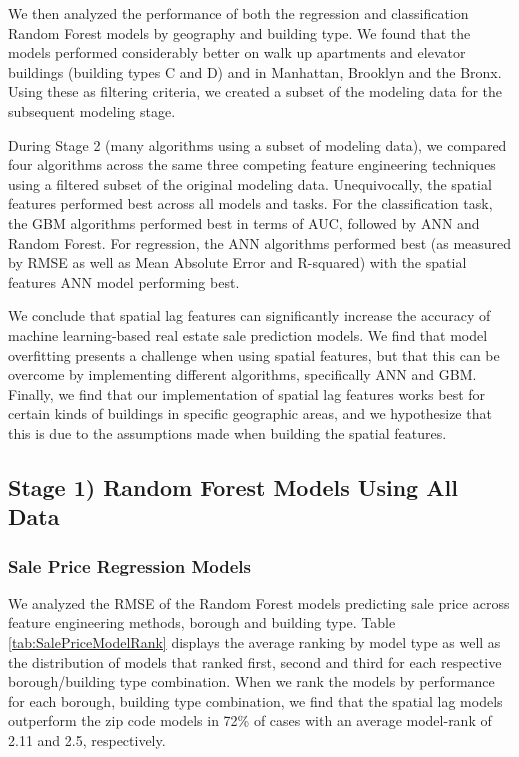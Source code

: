 \documentclass[12pt,]{article}
\begin{document}
We then analyzed the performance of both the regression and
classification Random Forest models by geography and building type. We
found that the models performed considerably better on walk up
apartments and elevator buildings (building types C and D) and in
Manhattan, Brooklyn and the Bronx. Using these as filtering criteria, we
created a subset of the modeling data for the subsequent modeling stage.

During Stage 2 (many algorithms using a subset of modeling data), we
compared four algorithms across the same three competing feature
engineering techniques using a filtered subset of the original modeling
data. Unequivocally, the spatial features performed best across all
models and tasks. For the classification task, the GBM algorithms
performed best in terms of AUC, followed by ANN and Random Forest. For
regression, the ANN algorithms performed best (as measured by RMSE as
well as Mean Absolute Error and R-squared) with the spatial features ANN
model performing best.

We conclude that spatial lag features can significantly increase the
accuracy of machine learning-based real estate sale prediction models.
We find that model overfitting presents a challenge when using spatial
features, but that this can be overcome by implementing different
algorithms, specifically ANN and GBM. Finally, we find that our
implementation of spatial lag features works best for certain kinds of
buildings in specific geographic areas, and we hypothesize that this is
due to the assumptions made when building the spatial features.

\hypertarget{stage-1-random-forest-models-using-all-data}{%
\subsection{Stage 1) Random Forest Models Using All
Data}\label{stage-1-random-forest-models-using-all-data}}

\hypertarget{sale-price-regression-models}{%
\subsubsection{Sale Price Regression
Models}\label{sale-price-regression-models}}

We analyzed the RMSE of the Random Forest models predicting sale price
across feature engineering methods, borough and building type. Table
\ref{tab:SalePriceModelRank} displays the average ranking by model type
as well as the distribution of models that ranked first, second and
third for each respective borough/building type combination. When we
rank the models by performance for each borough, building type
combination, we find that the spatial lag models outperform the zip code
models in 72\% of cases with an average model-rank of 2.11 and 2.5,
respectively.
\end{document}
